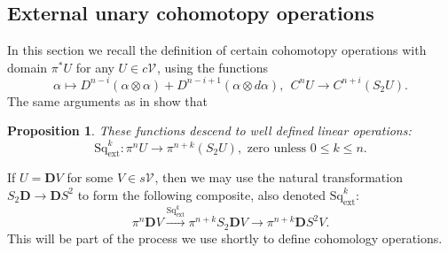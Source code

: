 \documentclass[11pt]{amsart} \renewcommand{\baselinestretch}{1.2}
\theoremstyle{plain}
\newtheorem{prop}[thm]{Proposition}
\numberwithin{equation}{section} %
\theoremstyle{plain}
\newtheorem{prop}[thm]{Proposition}
\numberwithin{equation}{chapter} %
\let\oldphi\phi
\let\phi\varphi
\renewcommand{\to}{\longrightarrow}
\newcommand{\calV}{\mathcal{V}}
\newcommand{\citeBOX}[2][]{\cite[\mbox{#1}]{#2}}
\newcommand{\vect}[2]{\calV^{#1}_{#2}}
\newcommand{\ExtCohOp}{\mathrm{Sq}_\mathrm{ext}}
\newcommand{\ExtCohProd}{\mu_\mathrm{ext}}
\newcommand{\F}{\mathbb{F}}
\newcommand{\Ftwo}{\F_2}
\newcommand{\dual}{\mathbf{D}}
\renewcommand{\mapsto}{\longmapsto}
\newcommand{\SubsectionOrSection}[1]{\subsection{#1}}
\begin{document}
\begin{Constructing cohomology operations}
\SubsectionOrSection{External unary cohomotopy operations}\label{External unary cohomotopy operations}
In this section we recall the definition of certain cohomotopy operations with domain $\pi^*U$ for any $U\in c\vect{}{}$, using the functions
\[\alpha\mapsto D^{n-i}(\alpha\otimes \alpha)+D^{n-i+1}(\alpha\otimes d\alpha),\ \ C^nU \to C^{n+i}(S_2U).\]
The same arguments as in \citeBOX[\S1.12]{MR2245560} show that
\begin{prop}
\label{external singly simplicial steenrods}
These functions descend to  well defined linear operations:
\[\ExtCohOp^k:\pi^{n}U\to \pi^{n+k}(S_2U),\text{ \ zero unless $0\leq k\leq n$.}\]
\end{prop}
If $U=\dual V$ for some $V\in s\vect{}{}$, then we may use the natural transformation $S_2\dual\to\dual S^2$ to form the following composite, also denoted $\ExtCohOp^k$:
\[\pi^n\dual V\overset{\ExtCohOp^k}{\to}\pi^{n+k}S_2\dual V\to \pi^{n+k}\dual S^2V.\]
This will be part of the process we use shortly to define cohomology operations.




\end{Constructing cohomology operations}
\end{document}
